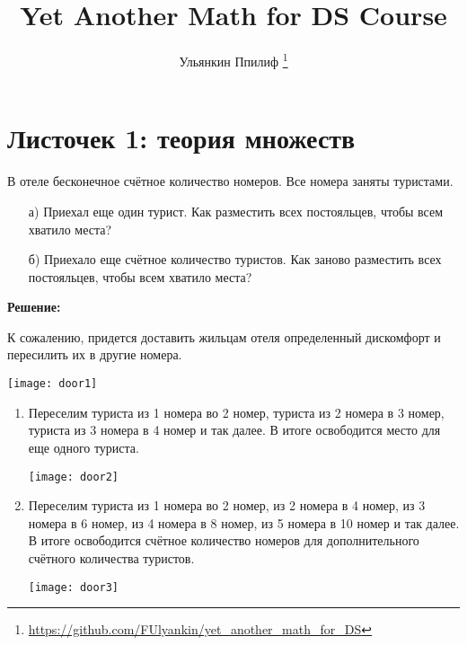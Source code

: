 \documentclass[12pt, a4paper, oneside]{article}
\title{Yet Another Math for DS Course}
\date{}
\author{Ульянкин Ппилиф \thanks{\url{https://github.com/FUlyankin/yet_another_math_for_DS}}}
\begin{document}
    
\maketitle

\vspace{-3cm}
\epigraph{}{}

\vspace{-2cm}

\section{Листочек 1: теория множеств}

\begin{problem}{}
В отеле бесконечное счётное количество номеров. Все номера заняты туристами.
    \begin{enumerate}
    \item[а)] Приехал еще один турист. Как разместить всех постояльцев, чтобы всем хватило места?
    \item[б)] Приехало еще счётное количество туристов. Как заново разместить всех постояльцев, чтобы всем хватило места?
    \end{enumerate}
\end{problem}

\textbf{Решение:}

К сожалению, придется доставить жильцам отеля определенный дискомфорт и пересилить их в другие номера.

\begin{center}
\texttt{[image: door1]}
\end{center}

\begin{enumerate}
\item Переселим туриста из 1 номера во 2 номер, туриста из 2 номера в 3 номер, туриста из 3 номера в 4 номер и так далее. В итоге освободится место для еще одного туриста.

\begin{center}
\texttt{[image: door2]}
\end{center}

\item Переселим туриста из 1 номера во 2 номер, из 2 номера в 4 номер, из 3 номера в 6 номер, из 4 номера в 8 номер, из 5 номера в 10 номер и так далее. В итоге освободится счётное количество номеров для дополнительного счётного количества туристов.

\begin{center}
\texttt{[image: door3]}
\end{center}

\end{enumerate}
\end{document}
